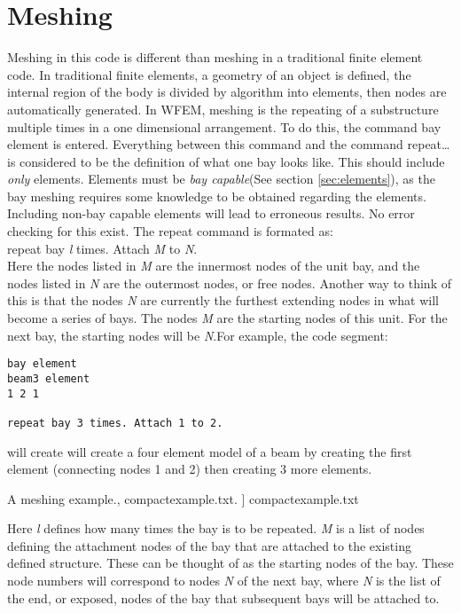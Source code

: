 \documentclass[12pt]{article}
\newcommand*{\sarg}[1]{\textit{#1}}
\newcommand*{\command}[1]{\textsf{#1}}
\newcommand*{\varg}[1]{\textit{#1}}
\newcommand{\includelisting}[2]{{\small\label{listing:#1}#2, #1. }]{ #1}}}
\begin{document}
\section{Meshing}
Meshing in this code is different than meshing in a traditional finite element code. In traditional finite elements, a geometry of an object is defined, the internal region of the body is divided by algorithm into elements, then  nodes are automatically generated. In WFEM, meshing is the repeating of a substructure multiple times in a one dimensional arrangement. To do this, the command \command{bay element} is entered.  Everything between this command and the command \command{repeat\ldots} is considered to be the definition of what one bay looks like. This should include \emph{only} elements. Elements must be \emph{bay capable}(See section \ref{sec:elements}), as the bay meshing requires some knowledge to be obtained regarding the elements. Including non-bay capable elements will lead to erroneous results. No error checking for this exist. The \command{repeat} command is formated as:\\
 \command{repeat bay} \sarg{l} \command{ times. Attach } \varg{M}
 \command{to} \varg{N}.\\
\noindent Here the nodes listed in \varg{M} are the innermost nodes of the unit bay, and the nodes listed in \varg{N} are the outermost nodes, or free nodes. Another way to think of this is that the nodes \varg{N} are currently the furthest extending nodes in what will become a series of bays. The nodes \varg{M} are the starting nodes of this unit. For the next bay, the starting nodes will be \varg{N}.For example, the code segment:
\begin{lstlisting}
bay element
beam3 element
1 2 1

repeat bay 3 times. Attach 1 to 2. 
\end{lstlisting}
will create will create a four element model of a beam by creating the first element (connecting nodes 1 and 2) then creating 3 more elements. 

%
 \includelisting{compactexample.txt}{A meshing example.}
 
 Here \sarg{l} defines how many times the bay is to be repeated.
 \varg{M} is a list of nodes defining the attachment nodes of the bay
 that are attached to the existing defined structure. These can be
 thought of as the starting nodes of the bay. These node numbers will
 correspond to nodes \varg{N} of the next bay, where \varg{N} is the
 list of the end, or exposed, nodes of the bay that subsequent bays
 will be attached to.
\end{document}
